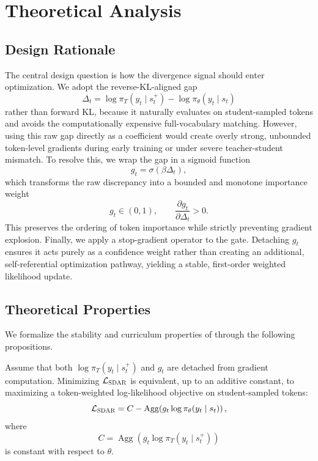 \section{Theoretical Analysis}
\label{appendix:proof}
\subsection{Design Rationale}

The central design question is how the divergence signal should enter optimization.
We adopt the reverse-KL-aligned gap
\[
\Delta_t = \log \pi_T(y_t \mid s_t^{+}) - \log \pi_{\theta}(y_t \mid s_t)
\]
rather than forward KL, because it naturally evaluates on student-sampled tokens
and avoids the computationally expensive full-vocabulary matching.
However, using this raw gap directly as a coefficient would create overly strong,
unbounded token-level gradients during early training or under severe teacher-student mismatch.
To resolve this, we wrap the gap in a sigmoid function
\[
g_t = \sigma(\beta \Delta_t),
\]
which transforms the raw discrepancy into a bounded and monotone importance weight
\[
g_t \in (0,1), \qquad \frac{\partial g_t}{\partial \Delta_t} > 0.
\]
This preserves the ordering of token importance while strictly preventing gradient explosion.
Finally, we apply a stop-gradient operator to the gate.
Detaching $g_t$ ensures it acts purely as a confidence weight
rather than creating an additional, self-referential optimization pathway,
yielding a stable, first-order weighted likelihood update.

\subsection{Theoretical Properties}

We formalize the stability and curriculum properties of \methodname{} through the following propositions.

\begin{proposition}
\label{prop:weighted_mle}
Assume that both $\log \pi_T(y_t \mid s_t^{+})$ and $g_t$ are detached from gradient computation.
Minimizing $\mathcal{L}_{\textsc{SDAR}}$ is equivalent, up to an additive constant,
to maximizing a token-weighted log-likelihood objective on student-sampled tokens:
\[
\mathcal{L}_{\textsc{SDAR}}
= C - \operatorname{Agg}\!\left( g_t \log \pi_{\theta}(y_t \mid s_t) \right),
\]
where
\[
C = \operatorname{Agg}\!\left( g_t \log \pi_T(y_t \mid s_t^{+}) \right)
\]
is constant with respect to $\theta$.
\end{proposition}


